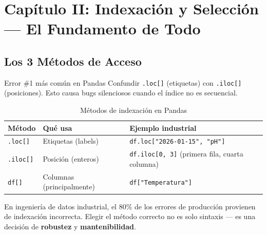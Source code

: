 \documentclass[11pt, a4paper]{article}
\begin{document}
\newpage

\section{Capítulo II: Indexación y Selección — El Fundamento de Todo}

\subsection{Los 3 Métodos de Acceso}

\begin{warningbox}{Error \#1 más común en Pandas}
Confundir \texttt{.loc[]} (etiquetas) con \texttt{.iloc[]} (posiciones). Esto causa bugs silenciosos cuando el índice no es secuencial.
\end{warningbox}

\begin{table}[h]
\centering
{}
\begin{tabular}{@{}lp{5cm}p{6cm}@{}}
\toprule
\textbf{Método} & \textbf{Qué usa} & \textbf{Ejemplo industrial} \\
\midrule
\texttt{.loc[]} & Etiquetas (labels) & \texttt{df.loc["2026-01-15", "pH"]} \\
\texttt{.iloc[]} & Posición (enteros) & \texttt{df.iloc[0, 3]} (primera fila, cuarta columna) \\
\texttt{df[]} & Columnas (principalmente) & \texttt{df["Temperatura"]} \\
\bottomrule
\end{tabular}
\caption{Métodos de indexación en Pandas}
\end{table}

En ingeniería de datos industrial, el 80\% de los errores de producción provienen de indexación incorrecta. Elegir el método correcto no es solo sintaxis — es una decisión de \textbf{robustez} y \textbf{mantenibilidad}.
\end{document}
